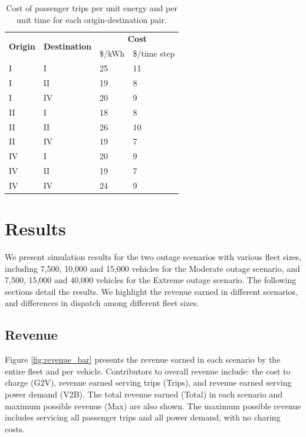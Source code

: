 \documentclass[journal]{IEEEtran}
\begin{document}
\begin{table}[!htbp]
    \renewcommand{\arraystretch}{1}
    \caption{Cost of passenger trips per unit energy and per unit time for each origin-destination pair.}
    \label{tab:trip_costs}
    \centering
    \def\colmargin{6.75cm}
    \begin{tabular}{llll}
    \hline
    \multirow{2}{*}{\textbf{Origin}} & \multirow{2}{*}{\textbf{Destination}} & \multicolumn{2}{c}{\textbf{Cost}} \\
     &  & \$/kWh & \$/time step \\
    \hline
    I  & I  & 25 & 11 \\
    I  & II & 19 & 8 \\
    I  & IV & 20 & 9 \\
    II & I  & 18 & 8 \\
    II & II & 26 & 10 \\
    II & IV & 19 & 7 \\
    IV & I  & 20 & 9 \\
    IV & II & 19 & 7 \\
    IV & IV & 24 & 9 \\
    \hline
    \end{tabular}
\end{table}

\section{Results}
We present simulation results for the two outage scenarios with various fleet sizes, including 7,500, 10,000 and 15,000 vehicles for the Moderate outage scenario, and 7,500, 15,000 and 40,000 vehicles for the Extreme outage scenario. The following sections detail the results. We highlight the revenue earned in different scenarios, and differences in dispatch among different fleet sizes.

\subsection{Revenue}
Figure \ref{fig:revenue_bar} presents the revenue earned in each scenario by the entire fleet and per vehicle. Contributors to overall revenue include: the cost to charge (G2V), revenue earned serving trips (Trips), and revenue earned serving power demand (V2B). The total revenue earned (Total) in each scenario and maximum possible revenue (Max) are also shown. The maximum possible revenue includes servicing all passenger trips and all power demand, with no charing costs.
\end{document}
